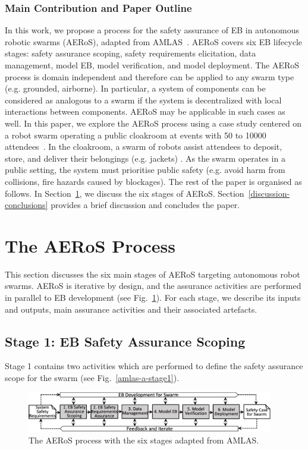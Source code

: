 \documentclass[runningheads]{llncs}
\begin{document}
	\subsubsection{Main Contribution and Paper Outline} 
	In this work, we propose a process for the safety assurance of EB in autonomous robotic swarms (AERoS), adapted from AMLAS~\cite{Hawkins2021}. 
	AERoS covers six EB lifecycle stages: safety assurance scoping, safety requirements elicitation, data management, model EB, model verification, and  model deployment. 
	The AERoS process is domain independent and therefore can be applied to any swarm type (e.g. grounded, airborne). 
	In particular, a system of components can be considered as analogous to a swarm if the system is decentralized with local interactions between components. 
	AERoS may be applicable in such cases as well. 
	In this paper, we explore the AERoS process using a case study centered on a robot swarm operating a public cloakroom at events with 50 to 10000 attendees~\cite{Jones2020}. 
	In the cloakroom, a swarm of robots assist attendees to deposit, store, and deliver their belongings (e.g. jackets) \cite{Jones2020}. 
	As the swarm operates in a public setting, the system must prioritise public safety (e.g. avoid harm from collisions, fire hazards caused by blockages). 
	The rest of the paper is organised as follows. 
	In Section~\ref{framework}, we discuss the six stages of AERoS. Section~\ref{discussion-conclusions} provides a brief discussion and concludes the paper. 
	
	\section{The AERoS Process}\label{framework}
	This section discusses the six main stages of AERoS targeting autonomous robot swarms. AERoS is iterative by design, and the assurance activities are performed in parallel to EB development (see Fig.~\ref{aeros-process}). For each stage, we describe its inputs and outputs, main assurance activities and their associated artefacts. 
	
	\subsection{Stage 1: EB Safety Assurance Scoping} \label{framework-stage1}
	Stage 1 contains two activities which are performed to define the safety assurance scope for the swarm (see Fig.~\ref{amlas-a-stage1}). 
	\begin{figure}[!t]
		\centering
		\vspace{-1.5ex}
		\includegraphics[width=0.96\textwidth]{figures/AERoS-Process.pdf}
		\vspace{-3ex}
		\caption{The AERoS process with the six stages adapted from AMLAS.} 
		\label{aeros-process}
	\end{figure}
	
\end{document}

